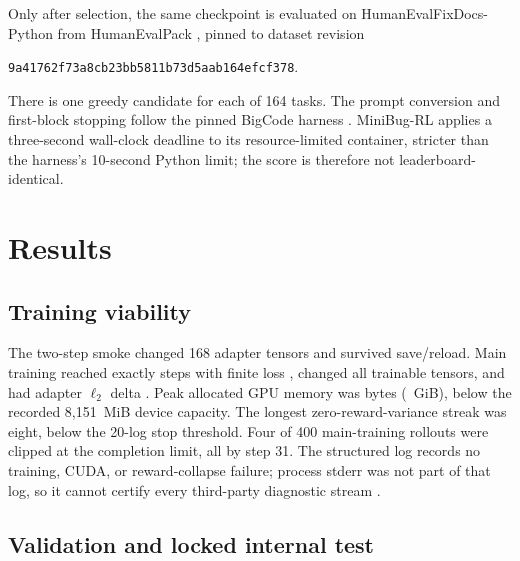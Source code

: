 \documentclass[11pt]{article}
\begin{document}
Only after selection, the same checkpoint is evaluated on HumanEvalFixDocs-Python from HumanEvalPack \cite{octopack,datasetcard}, pinned to dataset revision
\begin{center}
\small\texttt{9a41762f73a8cb23bb5811b73d5aab164efcf378}.
\end{center}
There is one greedy candidate for each of 164 tasks. The prompt conversion and first-block stopping follow the pinned BigCode harness \cite{bigcodeharness}. MiniBug-RL applies a three-second wall-clock deadline to its resource-limited container, stricter than the harness's 10-second Python limit; the score is therefore not leaderboard-identical.

\section{Results}

\subsection{Training viability}

The two-step smoke changed 168 adapter tensors and survived save/reload. Main training reached exactly \TrainSteps{} steps with finite loss \TrainLoss{}, changed all \ChangedTensors{} trainable tensors, and had adapter $\ell_2$ delta \AdapterDelta{}. Peak allocated GPU memory was \TrainPeakBytes{} bytes (\TrainPeakGiB{}~GiB), below the recorded 8,151~MiB device capacity. The longest zero-reward-variance streak was eight, below the 20-log stop threshold. Four of 400 main-training rollouts were clipped at the completion limit, all by step 31. The structured log records no training, CUDA, or reward-collapse failure; process stderr was not part of that log, so it cannot certify every third-party diagnostic stream \cite{runsummary}.

\subsection{Validation and locked internal test}
\end{document}
